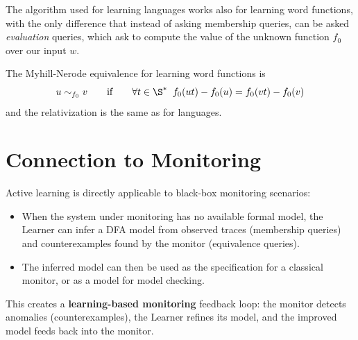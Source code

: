 \documentclass[oneside]{academica}
\begin{document}
The algorithm used for learning languages works also for learning word functions, with the only difference that instead of asking membership queries, can be asked \textit{evaluation} queries, which ask to compute the value of the unknown function $f_0$ over our input $w$.

\bigskip
The Myhill-Nerode equivalence for learning word functions is
\begin{equation*}
  u \sim_{f_0} v \qquad \text{if} \qquad \forall t \in \S^* \;\; f_0(ut) - f_0(u) = f_0(vt) - f_0(v)
\end{equation*}
and the relativization is the same as for languages.

\section{Connection to Monitoring}

Active learning is directly applicable to black-box monitoring scenarios:
\begin{itemize}
  \item When the system under monitoring has no available formal model, the Learner can infer a DFA model from observed traces (membership queries) and counterexamples found by the monitor (equivalence queries).
  \item The inferred model can then be used as the specification for a classical monitor, or as a model for model checking.
\end{itemize}
This creates a \textbf{learning-based monitoring} feedback loop: the monitor detects anomalies (counterexamples), the Learner refines its model, and the improved model feeds back into the monitor.
\end{document}

